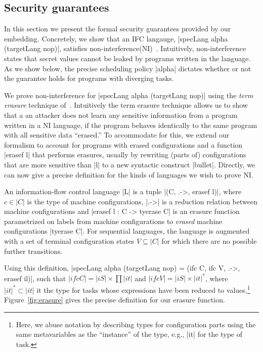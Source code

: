 \subsection{Security guarantees}
\label{sec:retrofit:formal}

In this section we present the formal security guarantees provided by
our embedding.
%
Concretely, we show that an IFC langauge, |specLang alpha (targetLang
nop)|, satisfies non-interference(NI)~\tocite{}.
%
Intuitively, non-interference states that secret values cannot be
leaked by programs written in the language.
%
As we show below, the precise scheduling policy |alpha| dictates
whether or not the guarantee holds for programs with diverging tasks.

We prove non-interference for |specLang alpha (targetLang nop)| using
the \emph{term erasure} technique of~\tocite{}.
%
Intuitively the term erasure technique allows us to show that a an
attacker does not learn any sensitive information from a program
written in a NI language, if the program behaves identically to the
same program with all sensitive data ``erased.''
% 
To accommodate for this, we extend our formalism to account for
programs with erased configurations and a function |erasef l| that
performs erasures, usually by rewriting (parts of) configurations that
are more sensitive than |l| to a new syntactic construct |bullet|.
%
Directly, we can now give a precise definition for the kinds of
languages we wish to prove NI.

\begin{definition}
    An information-flow control language |L| is a tuple |(C, .->,
    erasef l)|, where $c \in |C|$ is the type of machine configurations, |.->| is a
    reduction relation between machine configurations and |erasef l : C -> tyerase C|
    is an erasure function parametrized on labels from machine configurations to \emph{erased} machine
    configurations |tyerase C|.  For sequential languages, the
    language is augmented with a set of terminal configuration states $V
    \subseteq |C|$ for which there are no possible further transitions.
\end{definition}

Using this definition, |specLang alpha (targetLang nop) = (ifc C, ifc
V, .->, erasef il)|, such that $|ifc C| = |iS| \times \prod |it|$ and
$|ifc V| = |iS| \times |it|^*$, where $|it|^* \subset |it|$ it the
type for tasks whose expressions have been reduced to
values.\footnote{
  Here, we abuse notation by describing types for configuration parts using the
  same metavariables as the ``instance'' of the type, e.g., |it| for the type of
  task.
}
%
Figure~\ref{fig:erasure} gives the precise definition for our erasure function.
%

